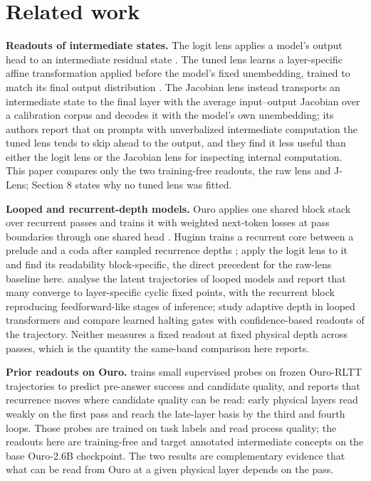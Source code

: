 \section{Related work}\label{related-work}

\textbf{Readouts of intermediate states.} The logit lens applies a
model's output head to an intermediate residual state
\citep{nostalgebraist2020logitlens}. The tuned lens learns a
layer-specific affine transformation applied before the model's fixed
unembedding, trained to match its final output distribution
\citep{belrose2023tunedlens}. The Jacobian lens
\citep{gurnee2026workspace} instead transports an intermediate state to
the final layer with the average input--output Jacobian over a
calibration corpus and decodes it with the model's own unembedding; its
authors report that on prompts with unverbalized intermediate
computation the tuned lens tends to skip ahead to the output, and they
find it less useful than either the logit lens or the Jacobian lens for
inspecting internal computation. This paper compares only the two
training-free readouts, the raw lens and J-Lens; Section 8 states why no
tuned lens was fitted.

\textbf{Looped and recurrent-depth models.} Ouro applies one shared
block stack over recurrent passes and trains it with weighted next-token
losses at pass boundaries through one shared head \citep{zhu2025ouro}.
Huginn trains a recurrent core between a prelude and a coda after
sampled recurrence depths \citep{geiping2025huginn};
\citet{lu2025latentcot} apply the logit lens to it and find its
readability block-specific, the direct precedent for the raw-lens
baseline here. \citet{blayney2026mechanistic} analyse the latent
trajectories of looped models and report that many converge to
layer-specific cyclic fixed points, with the recurrent block reproducing
feedforward-like stages of inference; \citet{popescu2026adaptive} study
adaptive depth in looped transformers and compare learned halting gates
with confidence-based readouts of the trajectory. Neither measures a
fixed readout at fixed physical depth across passes, which is the
quantity the same-band comparison here reports.

\textbf{Prior readouts on Ouro.} \citet{kirin2026opi} trains small
supervised probes on frozen Ouro-RLTT trajectories to predict pre-answer
success and candidate quality, and reports that recurrence moves where
candidate quality can be read: early physical layers read weakly on the
first pass and reach the late-layer basis by the third and fourth loops.
Those probes are trained on task labels and read process quality; the
readouts here are training-free and target annotated intermediate
concepts on the base Ouro-2.6B checkpoint. The two results are
complementary evidence that what can be read from Ouro at a given
physical layer depends on the pass.

